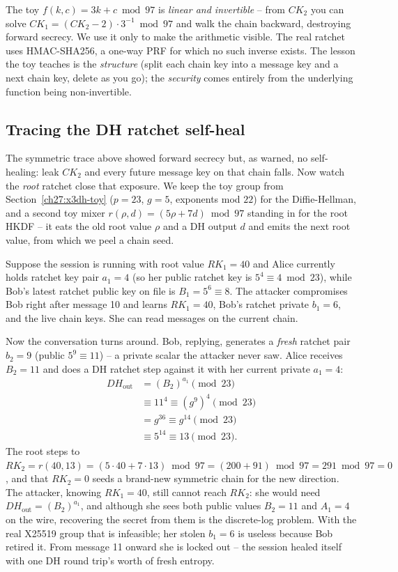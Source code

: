 \begin{trapbox}
The toy $f(k,c) = 3k + c \bmod 97$ is \emph{linear and invertible} -- from $CK_2$ you can solve $CK_1 = (CK_2 - 2)\cdot 3^{-1} \bmod 97$ and walk the chain backward, destroying forward secrecy. We use it only to make the arithmetic visible. The real ratchet uses HMAC-SHA256, a one-way PRF for which no such inverse exists. The lesson the toy teaches is the \emph{structure} (split each chain key into a message key and a next chain key, delete as you go); the \emph{security} comes entirely from the underlying function being non-invertible.
\end{trapbox}

\subsection{Tracing the DH ratchet self-heal}
\label{ch27:dh-ratchet-toy}

The symmetric trace above showed forward secrecy but, as warned, no self-healing: leak $CK_2$ and every future message key on that chain falls. Now watch the \emph{root} ratchet close that exposure. We keep the toy group from Section~\ref{ch27:x3dh-toy} ($p = 23$, $g = 5$, exponents mod $22$) for the Diffie-Hellman, and a second toy mixer $r(\rho, d) = (5\rho + 7d)\bmod 97$ standing in for the root HKDF -- it eats the old root value $\rho$ and a DH output $d$ and emits the next root value, from which we peel a chain seed.

Suppose the session is running with root value $RK_1 = 40$ and Alice currently holds ratchet key pair $a_1 = 4$ (so her public ratchet key is $5^{4} \equiv 4 \bmod 23$), while Bob's latest ratchet public key on file is $B_1 = 5^{6} \equiv 8$. The attacker compromises Bob right after message 10 and learns $RK_1 = 40$, Bob's ratchet private $b_1 = 6$, and the live chain keys. She can read messages on the current chain.

Now the conversation turns around. Bob, replying, generates a \emph{fresh} ratchet pair $b_2 = 9$ (public $5^{9} \equiv 11$) -- a private scalar the attacker never saw. Alice receives $B_2 = 11$ and does a DH ratchet step against it with her current private $a_1 = 4$:
\begin{align*}
DH_{\mathrm{out}} &= (B_2)^{a_1} \pmod{23}\\
&\equiv 11^{4} \equiv (g^9)^4 \pmod{23}\\
&= g^{36} \equiv g^{14} \pmod{23}\\
&\equiv 5^{14} \equiv 13 \pmod{23}.
\end{align*}
The root steps to $RK_2 = r(40, 13) = (5\cdot 40 + 7\cdot 13)\bmod 97 = (200 + 91)\bmod 97 = 291\bmod 97 = 0$, and that $RK_2 = 0$ seeds a brand-new symmetric chain for the new direction. The attacker, knowing $RK_1 = 40$, still cannot reach $RK_2$: she would need $DH_{\mathrm{out}} = (B_2)^{a_1}$, and although she sees both public values $B_2 = 11$ and $A_1 = 4$ on the wire, recovering the secret from them is the discrete-log problem. With the real X25519 group that is infeasible; her stolen $b_1 = 6$ is useless because Bob retired it. From message 11 onward she is locked out -- the session healed itself with one DH round trip's worth of fresh entropy.

